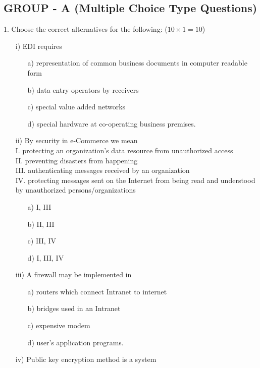 \documentclass{article}
\begin{document}
\subsection*{GROUP - A (Multiple Choice Type Questions)}
1. Choose the correct alternatives for the following: ($10 \times 1 = 10$)
\begin{enumerate}
    \item[i)] EDI requires
    \begin{enumerate}
        \item[a)] representation of common business documents in computer readable form
        \item[b)] data entry operators by receivers
        \item[c)] special value added networks
        \item[d)] special hardware at co-operating business premises.
    \end{enumerate}
    \item[ii)] By security in e-Commerce we mean \\
    I. protecting an organization's data resource from unauthorized access \\
    II. preventing disasters from happening \\
    III. authenticating messages received by an organization \\
    IV. protecting messages sent on the Internet from being read and understood by unauthorized persons/organizations
    \begin{enumerate}
        \item[a)] I, III
        \item[b)] II, III
        \item[c)] III, IV
        \item[d)] I, III, IV
    \end{enumerate}
    \item[iii)] A firewall may be implemented in
    \begin{enumerate}
        \item[a)] routers which connect Intranet to internet
        \item[b)] bridges used in an Intranet
        \item[c)] expensive modem
        \item[d)] user's application programs.
    \end{enumerate}
    \item[iv)] Public key encryption method is a system
    \begin{enumerate}

\end{enumerate}
\end{enumerate}
\end{document}
